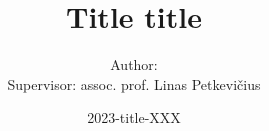 
\title[Title lower]
{Title title}

\author[Author lower]
{Author: \\
Supervisor: assoc. prof. Linas Petkevičius}
 

\date[2023-lower-XXX]{2023-title-XXX}
